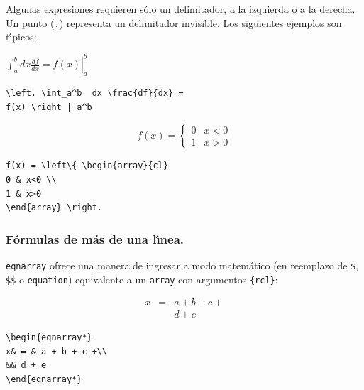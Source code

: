 Algunas expresiones requieren s{\'o}lo un delimitador, a la izquierda
o a la derecha. Un punto (\verb+.+) representa un delimitador
invisible. Los siguientes ejemplos son t\'{\i}picos: 

\vspace{.3cm}
{\small
\begin{minipage}[t]{5cm}
\begin{center}
$\displaystyle \left. 
\int_a^b  dx \frac{df}{dx} = f(x) \right |_a^b$
\end{center}
\end{minipage}
\hspace{.5cm}
\begin{minipage}[t]{5cm}
\begin{verbatim}
\left. \int_a^b  dx \frac{df}{dx} = 
f(x) \right |_a^b
\end{verbatim}
\end{minipage}

\vspace{.5cm}
\begin{minipage}[t]{5cm}
$$\displaystyle f(x) = \left\{ \begin{array}{cl}
0 & x<0 \\
1 & x>0 
\end{array} \right. $$
\end{minipage}
\hspace{.5cm}
\begin{minipage}[t]{5cm}
\begin{verbatim}
f(x) = \left\{ \begin{array}{cl}
0 & x<0 \\
1 & x>0 
\end{array} \right. 
\end{verbatim}
\end{minipage}
}
\vspace{.3cm}

\subsubsection{F{\'o}rmulas de m{\'a}s de una l{\'\i}nea.}

\verb+eqnarray+ ofrece una manera de ingresar a modo matem{\'a}tico (en
reemplazo de \verb+$+, \verb+$$+ o \verb+equation+) equivalente a un
\verb+array+ con argumentos \verb+{rcl}+:

\vspace{.3cm}
{\small
\begin{minipage}[c]{5cm}
\begin{eqnarray*}
x& = & a + b + c +\\
&& d + e
\end{eqnarray*}
\end{minipage}
\hspace{2cm}
\begin{minipage}[t]{5cm}
\begin{verbatim}
\begin{eqnarray*}
x& = & a + b + c +\\
&& d + e
\end{eqnarray*}
\end{verbatim}
\end{minipage}
}
\vspace{.3cm}

